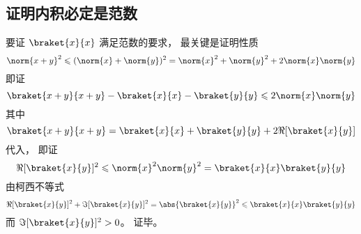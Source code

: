\subsection{证明内积必定是范数}
要证 $\braket{x}{x}$ 满足范数的要求， 最关键是证明性质
\begin{equation}
\norm{x+y}^2 \leqslant (\norm{x} + \norm{y})^2 = \norm{x}^2 + \norm{y}^2 + 2\norm{x}\norm{y}
\end{equation}
即证
\begin{equation}
\braket{x+y}{x+y} - \braket{x}{x} - \braket{y}{y} \leqslant 2\norm{x}\norm{y}
\end{equation}
其中
\begin{equation}
\braket{x+y}{x+y} = \braket{x}{x} + \braket{y}{y} + 2\Re[{\braket{x}{y}}]
\end{equation}
代入， 即证
\begin{equation}\label{InerPd_eq5}
\Re[{\braket{x}{y}}]^2 \leqslant \norm{x}^2\norm{y}^2 = \braket{x}{x}\braket{y}{y}
\end{equation}
由柯西不等式
\begin{equation}
\Re[\braket{x}{y}]^2 + \Im[\braket{x}{y}]^2 = \abs{\braket{x}{y}}^2 \leqslant \braket{x}{x}\braket{y}{y}
\end{equation}
而 $\Im[\braket{x}{y}]^2 > 0$。 证毕。
